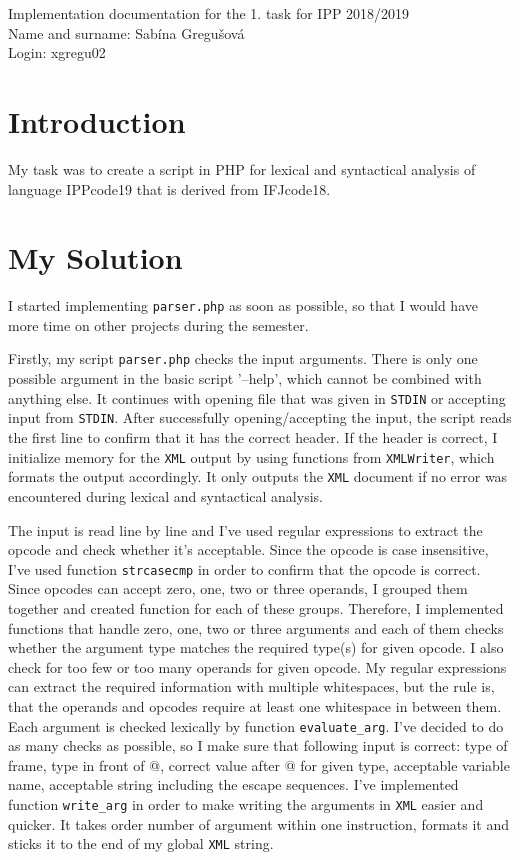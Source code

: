 \documentclass[10pt, a4paper]{article}
\begin{document}
\begin{center}
Implementation documentation for the 1. task for IPP 2018/2019\\
Name and surname: Sabína Gregušová\\
Login: xgregu02
\end{center}

\section*{Introduction}
My task was to create a script  in PHP for lexical and syntactical analysis of language IPPcode19 that is derived from IFJcode18.

\section*{My Solution}

I started implementing \texttt{parser.php} as soon as possible, so that I would have more time on other projects during the semester.

Firstly, my script \texttt{parser.php} checks the input arguments. There is only one possible argument in the basic script '--help', which cannot be combined with anything else. It continues with opening file that was given in \texttt{STDIN} or accepting input from \texttt{STDIN}. After successfully opening/accepting the input, the script reads the first line to confirm that it has the correct header. If the header is correct, I initialize memory for the \texttt{XML} output by using functions from \texttt{XMLWriter}, which formats the output accordingly. It only outputs the \texttt{XML} document if no error was encountered during lexical and syntactical analysis.


The input is read line by line and I've used regular expressions to extract the opcode and check whether it's acceptable. Since the opcode is case insensitive, I've used function \texttt{strcasecmp} in order to confirm that the opcode is correct. Since opcodes can accept zero, one, two or three operands, I grouped them together and created function for each of these groups. Therefore, I implemented functions that handle zero, one, two or three arguments and each of them checks whether the argument type matches the required type(s) for given opcode. I also check for too few or too many operands for given opcode. My regular expressions can extract the required information with multiple whitespaces, but the rule is, that the operands and opcodes require at least one whitespace in between them. Each argument is checked lexically by function \texttt{evaluate\_arg}. I've decided to do as many checks as possible, so I make sure that following input is correct: type of frame, type in front of @, correct value after @ for given type, acceptable variable name, acceptable string including the escape sequences. I've implemented function \texttt{write\_arg} in order to make writing the arguments in \texttt{XML} easier and quicker. It takes order number of argument within one instruction, formats it and sticks it to the end of my global \texttt{XML} string.
\end{document}
